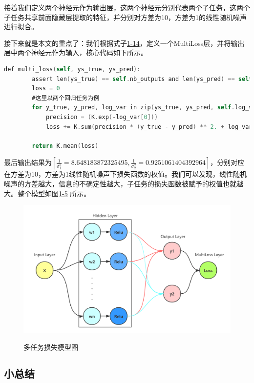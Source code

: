 接着我们定义两个神经元作为输出层，这两个神经元分别代表两个子任务，这两个子任务共享前面隐藏层提取的特征，并分别对方差为10，方差为1的线性随机噪声进行拟合。

接下来就是本文的重点了：我们根据式子\href{1-14}{1-14}，定义一个MultiLoss层，并将输出层中两个神经元作为输入，核心代码如下所示。

\begin{lstlisting}[language={C}, caption={MultiLoss Layer核心代码}]
 def multi_loss(self, ys_true, ys_pred):
        assert len(ys_true) == self.nb_outputs and len(ys_pred) == self.nb_outputs
        loss = 0
        #这里以两个回归任务为例
        for y_true, y_pred, log_var in zip(ys_true, ys_pred, self.log_vars):
            precision = (K.exp(-log_var[0]))
            loss += K.sum(precision * (y_true - y_pred) ** 2. + log_var[0], -1)

        return K.mean(loss)
\end{lstlisting}

最后输出结果为$[\frac{1}{\sigma_1^2} = 8.648183872325495, \frac{1}{\sigma_2^2} = 0.9251061404392964]$，分别对应在方差为10，方差为1线性随机噪声下损失函数的权值。我们可以发现，线性随机噪声的方差越大，信息的不确定性越大，子任务的损失函数被赋予的权值也就越大。整个模型如图\href{fig:1-5}{1-5} 所示。

\begin{figure}
  \centering
  \includegraphics[width=5in]{figure/example/MultiLoss.png}\\
  \caption{多任务损失模型图}
  \label{fig:1-4}
\end{figure}

\subsection{小总结}

